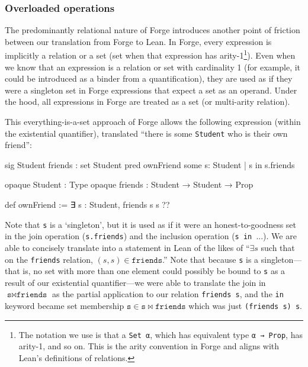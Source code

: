 \subsubsection{Overloaded operations}
The predominantly relational nature of Forge introduces another point of friction between our translation from Forge to Lean. In Forge, every expression is implicitly a relation or a set (set when that expression has arity-1\footnote{The notation we use is that a \texttt{Set α}, which has equivalent type \texttt{α → Prop}, has arity-1, and so on. This is the arity convention in Forge and aligns with Lean's definitions of relations.}). Even when we know that an expression is a relation or set with cardinality 1 (for example, it could be introduced as a binder from a quantification), they are used as if they were a singleton set in Forge expressions that expect a set as an operand. Under the hood, all expressions in Forge are treated as a set (or multi-arity relation). 

This everything-is-a-set approach of Forge allows the following expression (within the existential quantifier), translated ``there is some \texttt{Student} who is their own friend'': 

\vspace{0.5em}
\noindent\begin{minipage}{0.5\textwidth}
\begin{forge*}
sig Student {
  friends : set Student
}
pred ownFriend {
  some s: Student |
    s in s.friends
}
\end{forge*}
\end{minipage}%
\begin{minipage}{0.5\textwidth}
\begin{lean*}
opaque Student : Type
opaque friends : Student → Student → Prop

def ownFriend := 
  ∃ s : Student, 
    friends s s
?\phantom{}?
\end{lean*}
\end{minipage}
\vspace{0.5em}\newline
Note that \texttt{s} is a `singleton', but it is used as if it were an honest-to-goodness set in the join operation (\texttt{s.friends}) and the inclusion operation (\texttt{s in }...). We are able to concisely translate into a statement in Lean of the likes of ``$\exists s$ such that on the \texttt{friends} relation, $(s,s)\in \texttt{friends}$.'' Note that because \texttt{s} is a singleton---that is, no set with more than one element could possibly be bound to \texttt{s} as a result of our existential quantifier---we were able to translate the join in $\texttt{s} \bowtie \texttt{friends}$ as the partial application to our relation \texttt{friends s}, and the \texttt{in} keyword became set membership $\texttt{s}\in \texttt{s} \bowtie \texttt{friends}$ which was just \texttt{(friends s) s}. 

